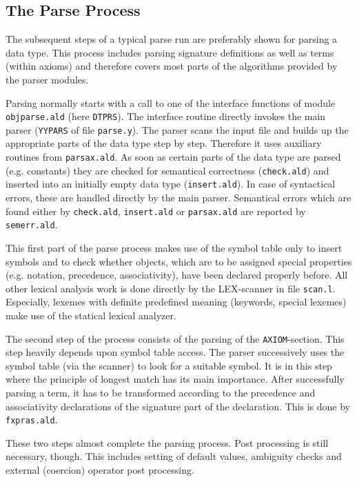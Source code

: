 \subsection{The Parse Process}

The subsequent steps of a typical parse run are preferably shown for
parsing a data type. 
This process includes parsing signature definitions
as well as terms (within axioms) and therefore covers most parts of
the algorithms provided by the parser modules.

Parsing normally starts with a call to one of the interface functions
of module {\tt objparse.ald} (here {\tt DTPRS}). The interface routine
directly invokes the main parser ({\tt YYPARS} of file {\tt parse.y}).
The parser scans the input file and builds up the appropriate parts
of the data type step by step. Therefore it uses auxiliary routines
from {\tt parsax.ald}. As soon as certain parts of the data type are parsed
(e.g. constants) they are checked for semantical correctness ({\tt check.ald})
and inserted into an initially empty data type ({\tt insert.ald}).
In case of syntactical errors, these are handled directly by
the main parser.
Semantical errors which are found either by {\tt check.ald},
{\tt insert.ald} or {\tt parsax.ald} are reported by {\tt semerr.ald}.

This first part of the parse process makes use of the symbol table
only to insert symbols and to check whether objects, which are to be assigned
special properties (e.g. notation, precedence, associativity),
have been declared properly before.
All other lexical analysis work is done directly by the LEX-scanner in file
{\tt scan.l}. Especially, lexemes with definite predefined meaning
(keywords, special lexemes) make use of the statical lexical analyzer.

The second step of the process consists of the parsing of the
{\tt AXIOM}-section.
This step heavily depends upon symbol table access.
The parser successively uses the symbol table (via the scanner) to look
for a suitable symbol. It is in this step where the principle of longest
match has its main importance.
After successfully parsing a term, it has to be transformed according to the
precedence and associativity declarations of the
signature part of the declaration. 
This is done by {\tt fxpras.ald}.

These two steps almost complete the parsing process. Post processing
is still necessary, though. This includes setting of default values,
ambiguity checks and external (coercion) operator post processing.
